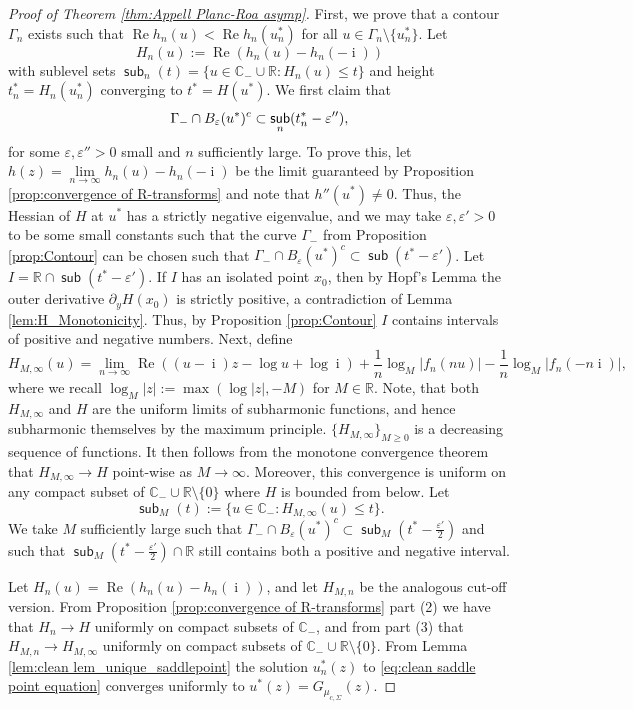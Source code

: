 \documentclass[reqno]{amsart}
\DeclareMathOperator{\sub}{\mathsf{sub}}
\newcommand{\1}{\mathbf{1}}
\DeclareMathOperator{\ii}{i}
\newcommand{\C}{\mathbb{C}}
\renewcommand\Re{\operatorname{Re}}
\newcommand{\eps}{\varepsilon}
\newcommand{\R}{\mathbb{R}}
\def\R{\mathbb{R}}
\theoremstyle{plain}
\theoremstyle{definition}
\theoremstyle{remark}
\numberwithin{equation}{section}
\begin{document}
\begin{proof}[Proof of Theorem \ref{thm:Appell Planc-Roa asymp}]
	
	First, we prove that a contour $\Gamma_{n}$ exists such that $\Re h_n(u)< \Re h_{n}(u_n^*)$ for all $u\in\Gamma_{n}\setminus\{u_n^*\}$. Let 
	$$H_n(u):=\Re\left( h_{n}(u)-h_n(-\ii)\right)$$
	with sublevel sets
	$\sub_n(t)=\{u\in\C_{-}\cup \R: H_n(u)\le t\}$ and height $t_n^*=H_{n}(u_n^*)$ converging to $t^*=H(u^*)$. We first claim that \begin{equation}\label{eq:Gamma_{-} in the sublevel set in n}
		\Gamma_-\cap B_{\eps}(u^*)^c\subset \sub_n(t_n^*-\eps''),
	\end{equation} for some $\varepsilon,\eps''>0$ small and $n$ sufficiently large.
	 To prove this, let $h(z)=\lim\limits_{n\rightarrow\infty} h_n(u)-h_n(-\ii)$ be the limit guaranteed by Proposition \ref{prop:convergence of R-transforms} and note that $h''(u^*)\neq 0$. Thus, the Hessian of $H$ at $u^*$ has a strictly negative eigenvalue, and we may take  $\eps,\eps'>0$ to be some small constants such that the curve $\Gamma_-$ from Proposition \ref{prop:Contour} can be chosen such that $\Gamma_-\cap B_{\eps}(u^*)^{c}\subset\sub(t^*-\eps')$.   Let $I=\R\cap\sub(t^*-\eps')$. If $I$ has an isolated point $x_0$, then by Hopf's Lemma \cite[\S 6.4]{Evans} the outer derivative  $\partial_yH(x_0)$ is strictly positive, a contradiction of Lemma \ref{lem:H_Monotonicity}. Thus, by Proposition \ref{prop:Contour} $I$ contains intervals of positive and negative numbers. Next, define \begin{equation}
			H_{M,\infty}(u)=\lim\limits_{n\rightarrow\infty}\Re \left( (u-\ii)z-\log u+\log\ii\right)+\frac{1}{n}\log_{M}| f_{n}(nu)|-\frac{1}{n}\log_{M}|f_{n}(-n\ii)|,
		\end{equation} 
		where we recall $\log_{M}|z|:=\max(\log|z|,-M)$ for $M\in\R$. Note, that both $H_{M,\infty}$ and $H$ are the uniform limits of subharmonic functions, and hence subharmonic themselves by the maximum principle. $\{H_{M,\infty}\}_{M\geq 0}$ is a decreasing sequence of functions. It then follows from the monotone convergence theorem that $H_{M,\infty}\rightarrow H$ point-wise as $M\rightarrow\infty$. Moreover, this convergence is uniform on any compact subset of $\C_-\cup\R\setminus\{0\}$ where $H$ is bounded from below. Let 
		\[\sub_{M}(t):=\{u\in\C_-: H_{M,\infty}(u)\leq t\}. \]
		We take $M$ sufficiently large such that $\Gamma_{-}\cap B_{\eps}(u^*)^{c}\subset \sub_{M}(t^*-\frac{\eps'}{2})$ and such that $\sub_{M}(t^*-\frac{\eps'}{2})\cap\R$ still contains both a positive and negative interval.
		
		 Let $H_{n}(u)=\Re \left(h_{n}(u)-h_n(\ii)\right)$, and let $H_{M,n}$ be the analogous cut-off version. From Proposition \ref{prop:convergence of R-transforms} part (2) we have that $H_n\rightarrow H$ uniformly on compact subsets of $\C_{-}$, and from part (3) that $H_{M,n}\rightarrow H_{M,\infty}$ uniformly on compact subsets of $\C_-\cup\R\setminus\{0\}$.  From Lemma \ref{lem:clean lem_unique_saddlepoint}  the solution $u_n^*(z)$ to \eqref{eq:clean saddle point equation} converges uniformly to $u^*(z)=G_{\mu_{c,\Sigma}}(z)$.  
		

\end{proof}
\end{document}
